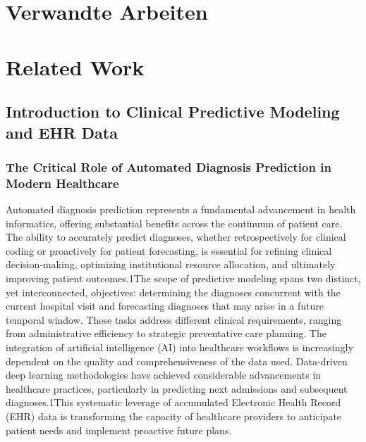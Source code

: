 {\chapter{Verwandte Arbeiten}}
{\chapter{Related Work}}
\label{sec:related}

\section{Introduction to Clinical Predictive Modeling and EHR Data}
\subsection{The Critical Role of Automated Diagnosis Prediction in Modern Healthcare}
Automated diagnosis prediction represents a fundamental advancement in health informatics, offering substantial benefits across the continuum of patient care. The ability to accurately predict diagnoses, whether retrospectively for clinical coding or proactively for patient forecasting, is essential for refining clinical decision-making, optimizing institutional resource allocation, and ultimately improving patient outcomes.1The scope of predictive modeling spans two distinct, yet interconnected, objectives: determining the diagnoses concurrent with the current hospital visit and forecasting diagnoses that may arise in a future temporal window. These tasks address different clinical requirements, ranging from administrative efficiency to strategic preventative care planning.
The integration of artificial intelligence (AI) into healthcare workflows is increasingly dependent on the quality and comprehensiveness of the data used. Data-driven deep learning methodologies have achieved considerable advancements in healthcare practices, particularly in predicting next admissions and subsequent diagnoses.1This systematic leverage of accumulated Electronic Health Record (EHR) data is transforming the capacity of healthcare providers to anticipate patient needs and implement proactive future plans.

